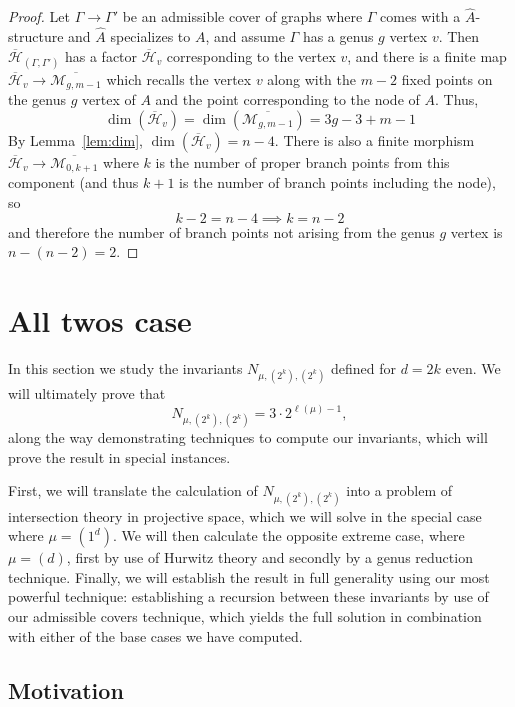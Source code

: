 \documentclass[11pt]{article}           %
\newcommand{\Hb}{\overline{\mathcal H}}
\theoremstyle{definition}
\begin{document}
                \begin{proof}
                  Let $\Gamma\to\Gamma'$ be an admissible cover of graphs where $\Gamma$ comes with a $\hat A$-structure and $\hat A$ specializes to $A$, and assume $\Gamma$ has a genus $g$ vertex $v$.
                  Then $\Hb_{(\Gamma,\Gamma')}$ has a factor $\Hb_{v}$ corresponding to the vertex $v$,
                  and there is a finite map $\Hb_{v}\to\overline{\mathcal M_{g,m-1}}$ which recalls
                  the vertex $v$ along with the $m-2$ fixed points on the genus $g$ vertex of $A$ and
                  the point corresponding to the node of $A$. Thus,
                  \[
                  \dim(\Hb_v)=\dim(\overline{\mathcal M_{g,m-1}})=3g-3+m-1
                  \]
                  By Lemma~\ref{lem:dim}, $\dim(\Hb_v)=n-4$. There is also a finite morphism
                  $\Hb_v\to\overline{\mathcal M_{0,k+1}}$ where $k$ is the number of proper branch points from this
                  component (and thus $k+1$ is the number of branch points including the node), so
                  \[
                  k-2=n-4\implies k=n-2
                  \]
                  and therefore the number of branch points not arising from the genus $g$ vertex is $n-(n-2)=2$.
                  \end{proof}


\section{All twos case}

In this section we study the invariants $N_{\mu,(2^k),(2^k)}$ defined for $d=2k$ even.
We will ultimately prove that
\[
N_{\mu,(2^k),(2^k)}=3\cdot 2^{\ell(\mu)-1},
\]
along the way demonstrating techniques to compute our invariants, which will prove the result in special instances.

First, we will translate the calculation of $N_{\mu,(2^k),(2^k)}$ into a problem of intersection theory
in projective space, which we will solve in the special case where $\mu=(1^d)$.
We will then calculate the opposite extreme case, where $\mu=(d)$, first by use of Hurwitz theory and
secondly by a genus reduction technique. Finally, we will establish the result in full generality using
our most powerful technique: establishing a recursion between these invariants by use of
our admissible covers technique, which yields the full solution in combination with either of the base
cases we have computed.

\subsection{Motivation}
\end{document}
